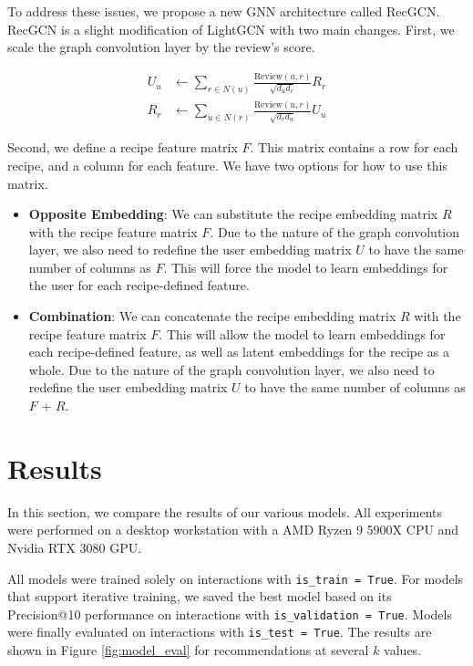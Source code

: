 \documentclass{article}
\begin{document}
To address these issues, we propose a new GNN architecture called RecGCN. RecGCN is a slight modification of LightGCN with two main changes. First, we scale the graph convolution layer by the review's score.

$$
  \begin{aligned}
    U_u & \gets \sum_{r \in N(u)} \frac{\text{Review}(u, r)}{\sqrt{d_u d_r}} R_r \\
    R_r & \gets \sum_{u \in N(r)} \frac{\text{Review}(u, r)}{\sqrt{d_r d_u}} U_u
  \end{aligned}
$$

Second, we define a recipe feature matrix $F$. This matrix contains a row for each recipe, and a column for each feature. We have two options for how to use this matrix.

\begin{itemize}
  \item \textbf{Opposite Embedding}: We can substitute the recipe embedding matrix $R$ with the recipe feature matrix $F$. Due to the nature of the graph convolution layer, we also need to redefine the user embedding matrix $U$ to have the same number of columns as $F$. This will force the model to learn embeddings for the user for each recipe-defined feature.
  \item \textbf{Combination}: We can concatenate the recipe embedding matrix $R$ with the recipe feature matrix $F$. This will allow the model to learn embeddings for each recipe-defined feature, as well as latent embeddings for the recipe as a whole. Due to the nature of the graph convolution layer, we also need to redefine the user embedding matrix $U$ to have the same number of columns as $F$ + $R$.
\end{itemize}


\section{Results}

In this section, we compare the results of our various models. All experiments were performed on a desktop workstation with a AMD Ryzen 9 5900X CPU and Nvidia RTX 3080 GPU.

All models were trained solely on interactions with \verb|is_train = True|. For models that support iterative training, we saved the best model based on its Precision@10 performance on interactions with \verb|is_validation = True|. Models were finally evaluated on interactions with \verb|is_test = True|. The results are shown in Figure \ref{fig:model_eval} for recommendations at several $k$ values.
\end{document}
